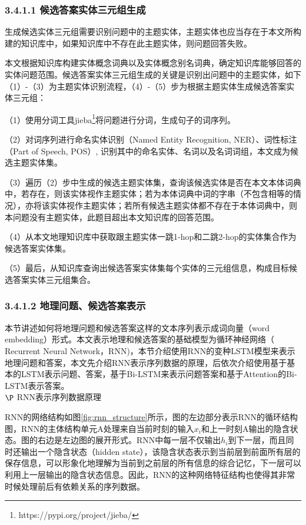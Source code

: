 \subsubsection{3.4.1.1 候选答案实体三元组生成}
生成候选实体三元组需要识别问题中的主题实体，主题实体也应当存在于本文所构建的知识库中，如果知识库中不存在此主题实体，则问题回答失败。

本文根据知识库构建实体概念词典以及实体概念别名词典，确定知识库能够回答的实体问题范围。候选答案实体三元组生成的关键是识别出问题中的主题实体，如下（1）-（3）为主题实体识别流程，（4）-（5）步为根据主题实体生成候选答案实体三元组：

（1）使用分词工具jieba\footnote{https://pypi.org/project/jieba/}将问题进行分词，生成句子的词序列。

（2）对词序列进行命名实体识别（Named Entity Recognition, NER）、词性标注（Part  of  Speech, POS）, 识别其中的命名实体、名词以及名词词组，本文成为候选主题实体集。

（3）遍历（2）步中生成的候选主题实体集，查询该候选实体是否在本文本体词典中，若存在，则该实体视作主题实体；若为本体词典中词的字串（不包含相等的情况），亦将该实体视作主题实体；若所有候选主题实体都不存在于本体词典中，则本问题没有主题实体，此题目超出本文知识库的回答范围。

（4）从本文地理知识库中获取跟主题实体一跳1-hop和二跳2-hop的实体集合作为候选答案实体集。

（5）最后，从知识库查询出候选答案实体集每个实体的三元组信息，构成目标候选答案实体三元组集合。


\subsubsection{3.4.1.2 地理问题、候选答案表示}
本节讲述如何将地理问题和候选答案这样的文本序列表示成词向量（word embedding）形式。本文表示地理和候选答案的基础模型为循环神经网络（ Recurrent Neural Network，RNN)，本节介绍使用RNN的变种LSTM模型来表示地理问题和答案，本文先介绍RNN表示序列数据的原理，后依次介绍使用基于基本的LSTM表示问题、答案，基于Bi-LSTM来表示问题答案和基于Attention的Bi-LSTM表示答案。
\\

$\P$ RNN表示序列数据原理

RNN的网络结构如图\ref{fig:rnn_structure}所示，图的左边部分表示RNN的循环结构图，RNN的主体结构单元A处理来自当前时刻的输入$x_{i}$和上一时刻A输出的隐含状态。图的右边是左边图的展开形式。RNN中每一层不仅输出$h_{i}$到下一层，而且同时还输出一个隐含状态（hidden state），该隐含状态表示到当前层到前面所有层的保存信息，可以形象化地理解为当前到之前层的所有信息的综合记忆，下一层可以利用上一层输出的隐含状态信息。因此，RNN的这种网络特征结构也使得其非常时候处理前后有依赖关系的序列数据。

